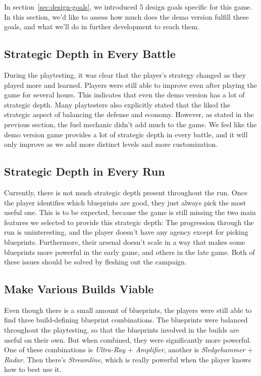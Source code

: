 In section~\ref{sec:design-goals}, we introduced 5 design goals specific for this game.
In this section, we'd like to assess how much does the demo version fulfill these goals, and what we'll do in further development to reach them.

\subsection{Strategic Depth in Every Battle}

During the playtesting, it was clear that the player's strategy changed as they played more and learned.
Players were still able to improve even after playing the game for several hours.
This indicates that even the demo version has a lot of strategic depth.
Many playtesters also explicitly stated that the liked the strategic aspect of balancing the defense and economy.
However, as stated in the previous section, the fuel mechanic didn't add much to the game.
We feel like the demo version game provides a lot of strategic depth in every battle, and it will only improve as we add more distinct levels and more customization.

\subsection{Strategic Depth in Every Run}

Currently, there is not much strategic depth present throughout the run.
Once the player identifies which blueprints are good, they just always pick the most useful one.
This is to be expected, because the game is still missing the two main features we selected to provide this strategic depth:
The progression through the run is uninteresting, and the player doesn't have any agency except for picking blueprints.
Furthermore, their arsenal doesn't scale in a way that makes some blueprints more powerful in the early game, and others in the late game.
Both of these issues should be solved by fleshing out the campaign.

\subsection{Make Various Builds Viable}

Even though there is a small amount of blueprints, the players were still able to find three build-defining blueprint combinations.
The blueprints were balanced throughout the playtesting, so that the blueprints involved in the builds are useful on their own.
But when combined, they were significantly more powerful.
One of these combinations is \emph{Ultra-Ray} + \emph{Amplifier}, another is \emph{Sledgehammer} + \emph{Radar}.
Then there's \emph{Streamline}, which is really powerful when the player knows how to best use it.

